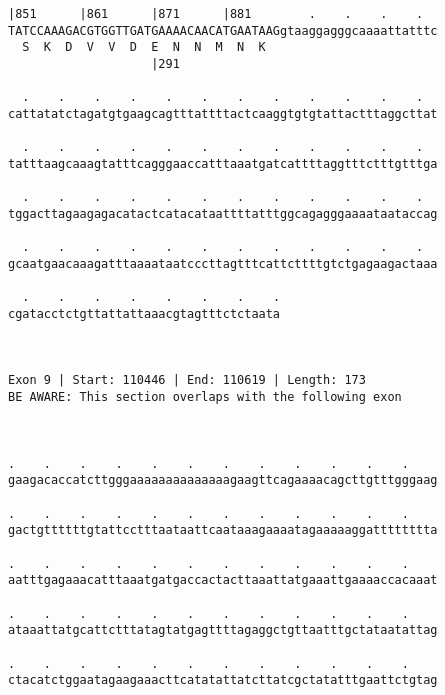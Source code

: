 \documentclass{article}
\begin{document}
\begin{Verbatim}
|851      |861      |871      |881        .    .    .    .  
TATCCAAAGACGTGGTTGATGAAAACAACATGAATAAGgtaaggagggcaaaattatttc
  S  K  D  V  V  D  E  N  N  M  N  K                        
                    |291                                    
  
  .    .    .    .    .    .    .    .    .    .    .    .  
cattatatctagatgtgaagcagtttattttactcaaggtgtgtattactttaggcttat
                                                            
  .    .    .    .    .    .    .    .    .    .    .    .  
tatttaagcaaagtatttcagggaaccatttaaatgatcattttaggtttctttgtttga
                                                            
  .    .    .    .    .    .    .    .    .    .    .    .  
tggacttagaagagacatactcatacataattttatttggcagagggaaaataataccag
                                                            
  .    .    .    .    .    .    .    .    .    .    .    .  
gcaatgaacaaagatttaaaataatcccttagtttcattcttttgtctgagaagactaaa
                                                            
  .    .    .    .    .    .    .    .
cgatacctctgttattattaaacgtagtttctctaata
                                      
                                      
 
Exon 9 | Start: 110446 | End: 110619 | Length: 173
BE AWARE: This section overlaps with the following exon



.    .    .    .    .    .    .    .    .    .    .    .    
gaagacaccatcttgggaaaaaaaaaaaaaagaagttcagaaaacagcttgtttgggaag
                                                            
.    .    .    .    .    .    .    .    .    .    .    .    
gactgttttttgtattcctttaataattcaataaagaaaatagaaaaaggatttttttta
                                                            
.    .    .    .    .    .    .    .    .    .    .    .    
aatttgagaaacatttaaatgatgaccactacttaaattatgaaattgaaaaccacaaat
                                                            
.    .    .    .    .    .    .    .    .    .    .    .    
ataaattatgcattctttatagtatgagttttagaggctgttaatttgctataatattag
                                                            
.    .    .    .    .    .    .    .    .    .    .    .    
ctacatctggaatagaagaaacttcatatattatcttatcgctatatttgaattctgtag
                                                            

\end{Verbatim}
\end{document}
